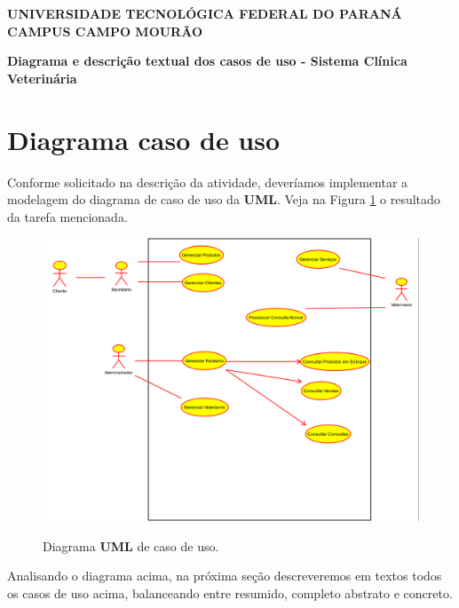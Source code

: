 \documentclass[a4paper, 12pt]{article}
\begin{document}
	\hspace{2cm}

	\begin{large}
		\begin{center}
			\textbf{UNIVERSIDADE TECNOLÓGICA FEDERAL DO PARANÁ}\newline
			\textbf{CAMPUS CAMPO MOURÃO}
		\end{center}
	\end{large}
	
	\vspace{0.5cm}
	
	\begin{center}
		\textbf{Diagrama e descrição textual dos casos de uso - Sistema Clínica Veterinária}
	\end{center}


	\section{Diagrama caso de uso}
	
	Conforme solicitado na descrição da atividade, deveríamos implementar a modelagem do diagrama de caso de uso da \textbf{UML}. Veja na Figura \ref{fig:DiagramaCasoUso} o resultado da tarefa mencionada.
	
	\begin{figure}[H]
		\centering
		\includegraphics[width=1\textwidth]{caso.png}
		\label{fig:DiagramaCasoUso}
		\caption{Diagrama \textbf{UML} de caso de uso.}		
	\end{figure}
	
	Analisando o diagrama acima, na próxima seção descreveremos em textos todos os casos de uso acima, balanceando entre resumido, completo abstrato e concreto.
	
\end{document}
